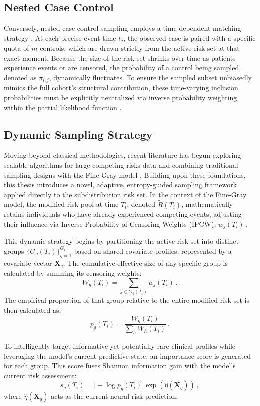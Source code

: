 \documentclass[a4paper,twoside,12pt]{report}
\begin{document}
\subsection{Nested Case Control}
Conversely, nested case-control sampling employs a time-dependent matching strategy \citep{Borgan2000}. At each precise event time $t_j$, the observed case is paired with a specific quota of $m$ controls, which are drawn strictly from the active risk set at that exact moment. Because the size of the risk set shrinks over time as patients experience events or are censored, the probability of a control being sampled, denoted as $\pi_{i,j}$, dynamically fluctuates. To ensure the sampled subset unbiasedly mimics the full cohort's structural contribution, these time-varying inclusion probabilities must be explicitly neutralized via inverse probability weighting within the partial likelihood function \citep{HorvitzThompson1952,Borgan2000}.

\subsection{Dynamic Sampling Strategy}
Moving beyond classical methodologies, recent literature has begun exploring scalable algorithms for large competing risks data \cite{kawaguchi2020scalable} and combining traditional sampling designs with the Fine-Gray model \cite{kim2020stratified}. Building upon these foundations, this thesis introduces a novel, adaptive, entropy-guided sampling framework applied directly to the subdistribution risk set. In the context of the Fine-Gray model, the modified risk pool at time $T_i$, denoted $\tilde{R}(T_i)$, mathematically retains individuals who have already experienced competing events, adjusting their influence via Inverse Probability of Censoring Weights (IPCW), $w_j(T_i) \,.$

This dynamic strategy begins by partitioning the active risk set into distinct groups $\{G_g(T_i)\}_{g=1}^{G_i}$ based on shared covariate profiles, represented by a covariate vector $\boldsymbol{X}_g$. The cumulative effective size of any specific group is calculated by summing its censoring weights:
$$W_g(T_i) = \sum_{j \in G_g(T_i)} w_j(T_i) \,.$$
The empirical proportion of that group relative to the entire modified risk set is then calculated as:
$$p_g(T_i) = \frac{W_g(T_i)}{\sum_h W_h(T_i)} \,.$$

To intelligently target informative yet potentially rare clinical profiles while leveraging the model's current predictive state, an importance score is generated for each group. This score fuses Shannon information gain with the model's current risk assessment:
$$s_g(T_i) = \bigl[-\log p_g(T_i)\bigr]\exp(\hat{\eta}(\boldsymbol{X}_g)) \,,$$
where $\hat{\eta}(\boldsymbol{X}_g)$ acts as the current neural risk prediction.
\end{document}
